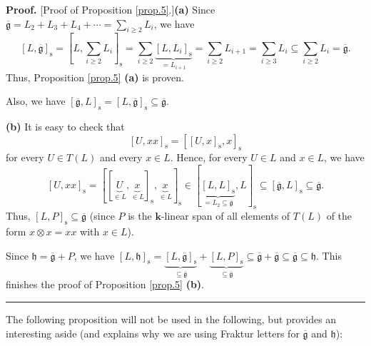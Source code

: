 \documentclass[numbers=enddot,12pt,final,onecolumn,notitlepage]{scrartcl}%
\theoremstyle{definition}
\newenvironment{proof}[1][Proof]{\noindent\textbf{#1.} }{\ \rule{0.5em}{0.5em}}
\let\sumnonlimits\sum
\renewcommand{\sum}{\sumnonlimits\limits}
\begin{document}
\begin{proof}
[Proof of Proposition \ref{prop.5}.]\textbf{(a)} Since $\overline
{\mathfrak{g}}=L_{2}+L_{3}+L_{4}+\cdots=\sum_{i\geq2}L_{i}$, we have
\[
\left[  L,\overline{\mathfrak{g}}\right]  _{\operatorname*{s}}=\left[
L,\sum_{i\geq2}L_{i}\right]  _{\operatorname*{s}}=\sum_{i\geq2}%
\underbrace{\left[  L,L_{i}\right]  _{\operatorname*{s}}}_{=L_{i+1}}%
=\sum_{i\geq2}L_{i+1}=\sum_{i\geq3}L_{i}\subseteq\sum_{i\geq2}L_{i}%
=\overline{\mathfrak{g}}.
\]
Thus, Proposition \ref{prop.5} \textbf{(a)} is proven. \medskip

Also, we have $\left[  \overline{\mathfrak{g}},L\right]  _{\operatorname*{s}%
}=\left[  L,\overline{\mathfrak{g}}\right]  _{\operatorname*{s}}%
\subseteq\overline{\mathfrak{g}}$. \medskip

\textbf{(b)} It is easy to check that
\begin{equation}
\left[  U,xx\right]  _{\operatorname*{s}}=\left[  \left[  U,x\right]
_{\operatorname*{s}},x\right]  _{\operatorname*{s}} \label{pf.prop.5.b.Uxx}%
\end{equation}
for every $U\in T\left(  L\right)  $ and every $x\in L$. Hence, for every
$U\in L$ and $x\in L$, we have%
\[
\left[  U,xx\right]  _{\operatorname*{s}}=\left[  \left[  \underbrace{U}_{\in
L},\underbrace{x}_{\in L}\right]  _{\operatorname*{s}},\underbrace{x}_{\in
L}\right]  _{\operatorname*{s}}\in\left[  \underbrace{\left[  L,L\right]
_{\operatorname*{s}}}_{=L_{2}\subseteq\overline{\mathfrak{g}}},L\right]
_{\operatorname*{s}}\subseteq\left[  \overline{\mathfrak{g}},L\right]
_{\operatorname*{s}}\subseteq\overline{\mathfrak{g}}.
\]
Thus, $\left[  L,P\right]  _{\operatorname*{s}}\subseteq\overline
{\mathfrak{g}}$ (since $P$ is the $\mathbf{k}$-linear span of all elements of
$T\left(  L\right)  $ of the form $x\otimes x=xx$ with $x\in L$).

Since $\mathfrak{h}=\overline{\mathfrak{g}}+P$, we have $\left[
L,\mathfrak{h}\right]  _{\operatorname*{s}}=\underbrace{\left[  L,\overline
{\mathfrak{g}}\right]  _{\operatorname*{s}}}_{\subseteq\overline{\mathfrak{g}%
}}+\underbrace{\left[  L,P\right]  _{\operatorname*{s}}}_{\subseteq
\overline{\mathfrak{g}}}\subseteq\overline{\mathfrak{g}}+\overline
{\mathfrak{g}}\subseteq\overline{\mathfrak{g}}\subseteq\mathfrak{h}$. This
finishes the proof of Proposition \ref{prop.5} \textbf{(b)}.
\end{proof}

The following proposition will not be used in the following, but provides an
interesting aside (and explains why we are using Fraktur letters for
$\overline{\mathfrak{g}}$ and $\mathfrak{h}$):
\end{document}
